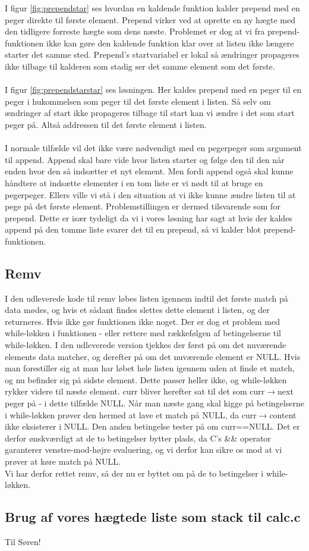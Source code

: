 \documentclass[10pt,a4paper,danish]{article}
\begin{document}
I figur \ref{fig:prependstar} ses hvordan en kaldende funktion kalder prepend med en peger direkte til første element. Prepend virker ved at oprette en ny hægte med den tidligere forreste hægte som dens næste. Problemet er dog at vi fra prepend-funktionen ikke kan gøre den kaldende funktion klar over at listen ikke længere starter det samme sted. Prepend's startvariabel er lokal så ændringer propageres ikke tilbage til kalderen som stadig ser det samme element som det første.\\
\\
I figur \ref{fig:prependstarstar} ses løsningen. Her kaldes prepend med en peger til en peger i hukommelsen som peger til det første element i listen. Så selv om ændringer af start ikke propageres tilbage til start kan vi ændre i det som start peger på. Altså addressen til det første element i listen.\\
\\
I normale tilfælde vil det ikke være nødvendigt med en pegerpeger som argument til append. Append skal bare vide hvor listen starter og følge den til den når enden hvor den så indsætter et nyt element.
Men fordi append også skal kunne håndtere at indsætte elementer i en tom liste er vi nødt til at bruge en pegerpeger. Ellers ville vi stå i den situation at vi ikke kunne ændre listen til at pege på det første element. Problemstillingen er dermed tilsvarende som for prepend. Dette er især tydeligt da vi i vores løsning har sagt at hvis der kaldes append på den tomme liste svarer det til en prepend, så vi kalder blot prepend-funktionen.

\subsection{Remv}
I den udleverede kode til remv løbes listen igennem indtil det første match på data mødes, og hvis et sådant findes slettes dette element i listen, og der returneres. Hvis ikke gør funktionen ikke noget. Der er dog et problem med while-løkken i funktionen - eller rettere med rækkefølgen af betingelserne til while-løkken. I den udleverede version tjekkes der først på om det nuværende elements data matcher, og derefter på om det nuværende element er NULL. Hvis man forestiller sig at man har løbet hele listen igennem uden at finde et match, og nu befinder sig på sidste element. Dette passer heller ikke, og while-løkken rykker videre til næste element. curr bliver herefter sat til det som curr$\rightarrow$next peger på - i dette tilfælde NULL. Når man næste gang skal kigge på betingelserne i while-løkken prøver den hermed at lave et match på NULL, da curr$\rightarrow$content ikke eksisterer i NULL. Den anden betingelse tester på om curr==NULL. Det er derfor ønskværdigt at de to betingelser bytter plads, da C's \&\& operator garanterer venstre-mod-højre evaluering, og vi derfor kan sikre os mod at vi prøver at køre match på NULL.\\

Vi har derfor rettet remv, så der nu er byttet om på de to betingelser i while-løkken.

\subsection{Brug af vores hægtede liste som stack til calc.c}
Til Søren!
\end{document}

